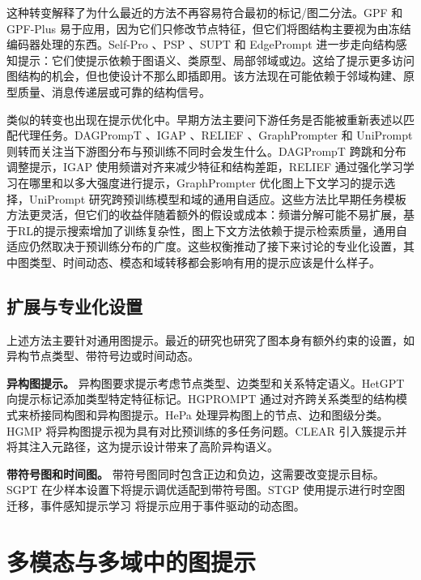 这种转变解释了为什么最近的方法不再容易符合最初的标记/图二分法。GPF 和 GPF-Plus 易于应用，因为它们只修改节点特征，但它们将图结构主要视为由冻结编码器处理的东西。Self-Pro \cite{gong2024selfpro}、PSP \cite{ge2024psp}、SUPT \cite{lee2024supt} 和 EdgePrompt \cite{fu2025edge} 进一步走向结构感知提示：它们使提示依赖于图语义、类原型、局部邻域或边。这给了提示更多访问图结构的机会，但也使设计不那么即插即用。该方法现在可能依赖于邻域构建、原型质量、消息传递层或可靠的结构信号。


类似的转变也出现在提示优化中。早期方法主要问下游任务是否能被重新表述以匹配代理任务。DAGPrompT \cite{chen2025dagprompt}、IGAP \cite{yan2024igap}、RELIEF \cite{zhu2024relief}、GraphPrompter \cite{lv2025graphprompter} 和 UniPrompt \cite{huang2025oneprompt} 则转而关注当下游图分布与预训练不同时会发生什么。DAGPrompT 跨跳和分布调整提示，IGAP 使用频谱对齐来减少特征和结构差距，RELIEF 通过强化学习学习在哪里和以多大强度进行提示，GraphPrompter 优化图上下文学习的提示选择，UniPrompt 研究跨预训练模型和域的通用自适应。这些方法比早期任务模板方法更灵活，但它们的收益伴随着额外的假设或成本：频谱分解可能不易扩展，基于RL的提示搜索增加了训练复杂性，图上下文方法依赖于提示检索质量，通用自适应仍然取决于预训练分布的广度。这些权衡推动了接下来讨论的专业化设置，其中图类型、时间动态、模态和域转移都会影响有用的提示应该是什么样子。


\subsection{扩展与专业化设置}\label{sec:pextensions}

上述方法主要针对通用图提示。最近的研究也研究了图本身有额外约束的设置，如异构节点类型、带符号边或时间动态。

\textbf{异构图提示。} 异构图要求提示考虑节点类型、边类型和关系特定语义。HetGPT \cite{ma2023hetgpt} 向提示标记添加类型特定特征标记。HGPROMPT \cite{yu_hgprompt_2024} 通过对齐跨关系类型的结构模式来桥接同构图和异构图提示。HePa \cite{jia_hepa_2025} 处理异构图上的节点、边和图级分类。HGMP \cite{jiao_hgmp_2025} 将异构图提示视为具有对比预训练的多任务问题。CLEAR \cite{wang2025clear} 引入簇提示并将其注入元路径，这为提示设计带来了高阶异构语义。

\textbf{带符号图和时间图。} 带符号图同时包含正边和负边，这需要改变提示目标。SGPT \cite{zhai2024sgpt} 在少样本设置下将提示调优适配到带符号图。STGP \cite{hu_prompt-based_2024} 使用提示进行时空图迁移，事件感知提示学习 \cite{yu_event-aware_2025} 将提示应用于事件驱动的动态图。

\section{多模态与多域中的图提示}\label{sec:pmodal}

